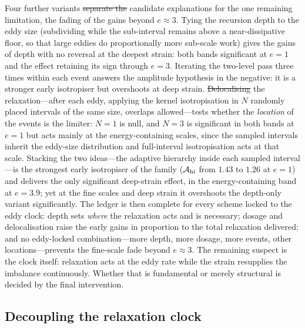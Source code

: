 \documentclass[lineno]{JFM-FLM_Au}
\providecommand{\DIFadd}[1]{{\protect\color{blue}\uwave{#1}}} %
\providecommand{\DIFdel}[1]{{\protect\color{red}\sout{#1}}} %
\providecommand{\DIFaddbegin}{} %
\providecommand{\DIFaddend}{} %
\providecommand{\DIFdelbegin}{} %
\providecommand{\DIFdelend}{} %
\begin{document}
Four further variants \DIFdelbegin \DIFdel{separate the }\DIFdelend \DIFaddbegin \DIFadd{instantiate distinct }\DIFaddend candidate explanations for the one remaining limitation, the fading of the gains beyond $e\approx3$. Tying
the recursion depth to the eddy size (subdividing while the sub-interval
remains above a near-dissipative floor, so that large eddies do
proportionally more sub-scale work) gives the gains of depth with no
reversal at the deepest strain: both bands significant at $e=1$ and the
effect retaining its sign through $e=3$. Iterating the two-level pass
three times within each event answers the amplitude hypothesis in the
negative: it is a stronger early isotropiser but overshoots at deep
strain. \DIFdelbegin \DIFdel{Delocalising }\DIFdelend \DIFaddbegin \DIFadd{Spatially delocalising }\DIFaddend the relaxation---after each eddy, applying the
kernel isotropisation in $N$ randomly placed intervals of the same size,
overlaps allowed---tests whether the \emph{location} of the events is
the limiter: $N=1$ is null, and $N=3$ is significant in both bands at
$e=1$ but acts mainly at the energy-containing scales, since the sampled
intervals inherit the eddy-size distribution and full-interval
isotropisation acts at that scale. Stacking the two ideas---the adaptive
hierarchy inside each sampled interval---is the strongest early
isotropiser of the family ($\mathcal A_{\rm hi}$ from $1.43$ to $1.26$
at $e=1$) and delivers the only significant deep-strain effect, in the
energy-containing band at $e=3.9$; yet at the fine scales and deep
strain it overshoots the depth-only variant significantly. The ledger
is then complete for every scheme locked to the eddy clock: depth sets
\emph{where} the relaxation acts and is necessary; dosage and
delocalisation raise the early gains in proportion to the total
relaxation delivered; and no eddy-locked combination---more depth, more
dosage, more events, other locations---prevents the fine-scale fade
beyond $e\approx3$. The remaining suspect is the clock itself:
relaxation acts at the eddy rate while the strain resupplies the
imbalance continuously. Whether that is fundamental or merely
structural is decided by the final intervention.

\subsection{Decoupling the relaxation clock}\label{sec:clock}
\end{document}
